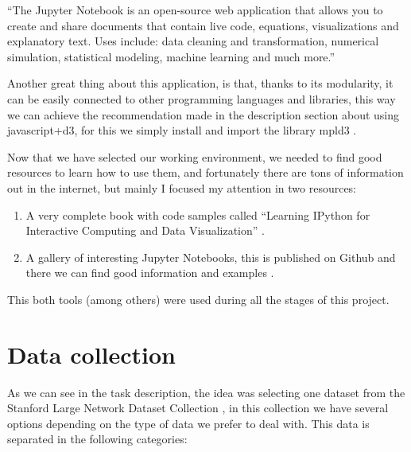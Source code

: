 \documentclass{article}
\begin{document}
  ``The Jupyter Notebook is an open-source web application that allows you to create and share documents that contain live code, equations, visualizations and explanatory text. Uses include: data cleaning and transformation, numerical simulation, statistical modeling, machine learning and much more.''\cite{website:jupyter.org}

  Another great thing about this application, is that, thanks to its modularity, it can be easily connected to other programming languages and libraries, this way we can achieve the recommendation made in the description section about using javascript+d3, for this we simply install and import the library mpld3 \cite{website:mpld3.github.io}.

  \bigskip

  Now that we have selected our working environment, we needed to find good resources to learn how to use them, and fortunately there are tons of information out in the internet, but mainly I focused my attention in two resources:

  \begin{enumerate}
    \item A very complete book with code samples called ``Learning IPython for Interactive Computing and Data Visualization'' \cite{rossant13}.
    \item A gallery of interesting Jupyter Notebooks, this is published on Github and there we can find good information and examples \cite{website:A-gallery-of-interesting-Jupyter-Notebooks}.
  \end{enumerate}

  This both tools (among others) were used during all the stages of this project.
\newpage
\section{Data collection}
  As we can see in the task description, the idea was selecting one dataset from the Stanford Large Network Dataset Collection \cite{website:snap.stanford.edudata}, in this collection we have several options depending on the type of data we prefer to deal with. This data is separated in the following categories:
\end{document}
